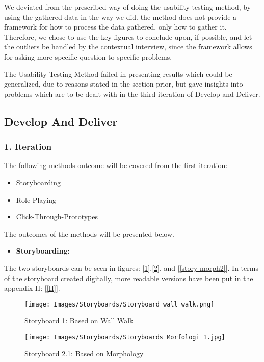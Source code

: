 We deviated from the prescribed way of doing the usability testing-method, by using the gathered data in the way we did. the method does not provide a framework for how to process the data gathered, only how to gather it. Therefore, we chose to use the key figures to conclude upon, if possible, and let the outliers be handled by the contextual interview, since the framework allows for asking more specific question to specific problems.   

The Usability Testing Method failed in presenting results which could be generalized, due to reasons stated in the section prior, but gave insights into problems which are to be dealt with in the third iteration of Develop and Deliver.

\subsection{Develop And Deliver}

\subsubsection{1. Iteration}

The following methods outcome will be covered from the first iteration:
\begin{itemize}
    \item Storyboarding
    \item Role-Playing
    \item Click-Through-Prototypes
\end{itemize}

The outcomes of the methods will be presented below.

\begin{itemize}
    \item \bf{Storyboarding:}
\end{itemize}

The two storyboards can be seen in figures: [\ref{story-wall}],[\ref{story-morph1}], and [\ref{story-morph2}]. In terms of the storyboard created digitally, more readable versions have been put in the appendix H: [\ref{H}].

\begin{figure}[H]
\caption{Storyboard 1: Based on Wall Walk}
\centering
\label{story-wall}
\texttt{[image: Images/Storyboards/Storyboard\_wall\_walk.png]}
\end{figure}

\begin{figure}[H]
\caption{Storyboard 2.1: Based on Morphology}
\centering
\label{story-morph1}
\texttt{[image: Images/Storyboards/Storyboards Morfologi 1.jpg]}
\end{figure}

